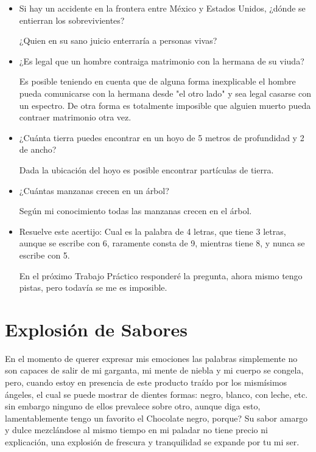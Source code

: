 \documentclass[11pt]{article}
\begin{document}
\begin{itemize}
    
  \item Si hay un accidente en la frontera entre México y Estados Unidos, ¿dónde se entierran los sobrevivientes?
  
  ¿Quien en su sano juicio enterraría a personas vivas?
  
  \item ¿Es legal que un hombre contraiga matrimonio con la hermana de su viuda?
    
   Es posible teniendo en cuenta que de alguna forma inexplicable el hombre pueda comunicarse con la hermana desde "el otro lado" y sea legal casarse con un espectro. De otra forma es totalmente imposible que alguien muerto pueda contraer matrimonio otra vez.  
  
  \item ¿Cuánta tierra puedes encontrar en un hoyo de 5 metros de profundidad y 2 de ancho?  
  
  Dada la ubicación del hoyo es posible encontrar partículas de tierra. 
  
  \item ¿Cuántas manzanas crecen en un árbol?
    
  Según mi conocimiento todas las manzanas crecen en el árbol. 
    
  \item  Resuelve este acertijo: Cual es la palabra de 4 letras, que tiene 3 letras, aunque se escribe con 6, raramente consta de 9, mientras tiene 8, y nunca se escribe con 5.   
    
   En el próximo Trabajo Práctico responderé la pregunta, ahora mismo tengo pistas, pero todavía se me es imposible. 
  
\end{itemize}



\section{Explosión de Sabores}

En el momento de querer expresar mis emociones las palabras simplemente no son capaces de salir de mi garganta, mi mente de niebla y mi cuerpo se congela, pero, cuando estoy en presencia de este producto  traído por los mismísimos ángeles, el cual se puede mostrar de dientes formas: negro, blanco, con leche, etc. sin embargo ninguno de ellos prevalece sobre otro, aunque diga esto, lamentablemente tengo un favorito el Chocolate negro, porque? Su sabor amargo y dulce mezclándose al mismo tiempo en mi paladar no tiene precio ni explicación, una explosión de frescura y tranquilidad se expande por tu mi ser.
\end{document}
